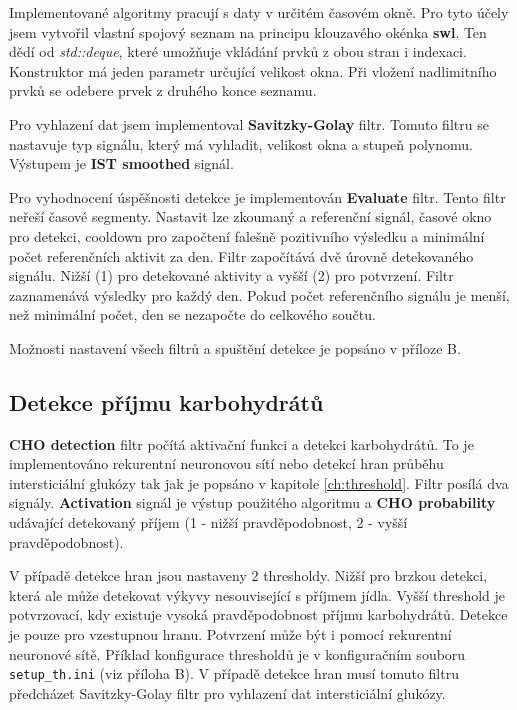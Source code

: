 Implementované algoritmy pracují s daty v určitém časovém okně. Pro tyto účely jsem vytvořil vlastní spojový seznam na principu klouzavého okénka \textbf{swl}. Ten dědí od \textit{std::deque}, které umožňuje vkládání prvků z obou stran i indexaci. Konstruktor má jeden parametr určující velikost okna. Při vložení nadlimitního prvků se odebere prvek z druhého konce seznamu.

Pro vyhlazení dat jsem implementoval \textbf{Savitzky-Golay} filtr. Tomuto filtru se nastavuje typ signálu, který má vyhladit, velikost okna a stupeň polynomu. Výstupem je \textbf{IST smoothed} signál.

Pro vyhodnocení úspěšnosti detekce je implementován \textbf{Evaluate} filtr. Tento filtr neřeší časové segmenty. Nastavit lze zkoumaný a referenční signál, časové okno pro detekci, cooldown pro započtení falešně pozitivního výsledku a minimální počet referenčních aktivit za den. Filtr započítává dvě úrovně detekovaného signálu. Nižší (1) pro detekované aktivity a vyšší (2) pro potvrzení. Filtr zaznamenává výsledky pro každý den. Pokud počet referenčního signálu je menší, než minimální počet, den se nezapočte do celkového součtu.

Možnosti nastavení všech filtrů a spuštění detekce je popsáno v příloze B.


\subsection{Detekce příjmu karbohydrátů}

\textbf{CHO detection} filtr počítá aktivační funkci a detekci karbohydrátů. To je implementováno rekurentní neuronovou sítí nebo detekcí hran průběhu intersticiální glukózy tak jak je popsáno v kapitole \ref{ch:threshold}. Filtr posílá dva signály. \textbf{Activation} signál je výstup použitého algoritmu a \textbf{CHO probability} udávající detekovaný příjem (1 - nižší pravděpodobnost, 2 - vyšší pravděpodobnost).

V případě detekce hran jsou nastaveny 2 thresholdy. Nižší pro brzkou detekci, která ale může detekovat výkyvy nesouvisející s příjmem jídla. Vyšší threshold je potvrzovací, kdy existuje vysoká pravděpodobnost příjmu karbohydrátů. Detekce je pouze pro vzestupnou hranu. Potvrzení může být i pomocí rekurentní neuronové sítě. Příklad konfigurace thresholdů je v konfiguračním souboru \texttt{setup\_th.ini} (viz příloha B). V případě detekce hran musí tomuto filtru předcházet Savitzky-Golay filtr pro vyhlazení dat intersticiální glukózy.

